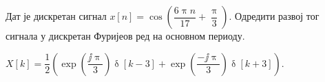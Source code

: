 \PID
Дат је дискретан сигнал 
$x[n] = \cos \left(
    \dfrac{6\uppi n}{17}  + \dfrac{\uppi}{3}
\right)$. Одредити развој тог сигнала у дискретан Фуријеов ред на основном периоду. 
\vspace*{2mm}

\textsc{}
$X[k] = \dfrac{1}{2}
\left(
    \exp\left( 
        \dfrac{\jj\uppi}{3}
     \right)
     \updelta[k-3] 
     +
     \exp\left( 
        \dfrac{-\jj\uppi}{3}
     \right)
     \updelta[k+3]
\right)$.